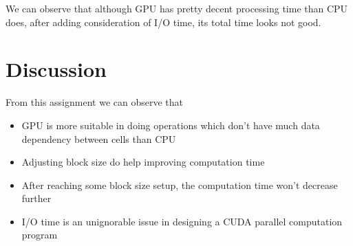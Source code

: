 \documentclass{article}
\begin{document}
	We can observe that although GPU has pretty decent processing time than CPU does, after adding consideration of I/O time, its total time looks not good.
	
	\section{Discussion}
	From this assignment we can observe that
	\begin{itemize}
		\item GPU is more suitable in doing operations which don’t have much data dependency between cells than CPU
		\item Adjusting block size do help improving computation time
		\item After reaching some block size setup, the computation time won’t decrease further
		\item I/O time is an unignorable issue in designing a CUDA parallel computation program
	\end{itemize}
\end{document}
